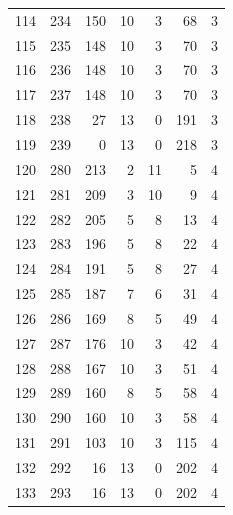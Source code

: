 \documentclass[a4paper,twoside,12pt]{book}
\begin{document}
\begin{appendices}
\begin{table}
\begin{tabular}{lrrrrrr}
		114 &    234 &       150 &        10 &               3 &              68 &         3 \\
		115 &    235 &       148 &        10 &               3 &              70 &         3 \\
		116 &    236 &       148 &        10 &               3 &              70 &         3 \\
		117 &    237 &       148 &        10 &               3 &              70 &         3 \\
		118 &    238 &        27 &        13 &               0 &             191 &         3 \\
		119 &    239 &         0 &        13 &               0 &             218 &         3 \\
		120 &    280 &       213 &         2 &              11 &               5 &         4 \\
		121 &    281 &       209 &         3 &              10 &               9 &         4 \\
		122 &    282 &       205 &         5 &               8 &              13 &         4 \\
		123 &    283 &       196 &         5 &               8 &              22 &         4 \\
		124 &    284 &       191 &         5 &               8 &              27 &         4 \\
		125 &    285 &       187 &         7 &               6 &              31 &         4 \\
		126 &    286 &       169 &         8 &               5 &              49 &         4 \\
		127 &    287 &       176 &        10 &               3 &              42 &         4 \\
		128 &    288 &       167 &        10 &               3 &              51 &         4 \\
		129 &    289 &       160 &         8 &               5 &              58 &         4 \\
		130 &    290 &       160 &        10 &               3 &              58 &         4 \\
		131 &    291 &       103 &        10 &               3 &             115 &         4 \\
		132 &    292 &        16 &        13 &               0 &             202 &         4 \\
		133 &    293 &        16 &        13 &               0 &             202 &         4 \\

\end{tabular}
\end{table}
\end{appendices}
\end{document}
